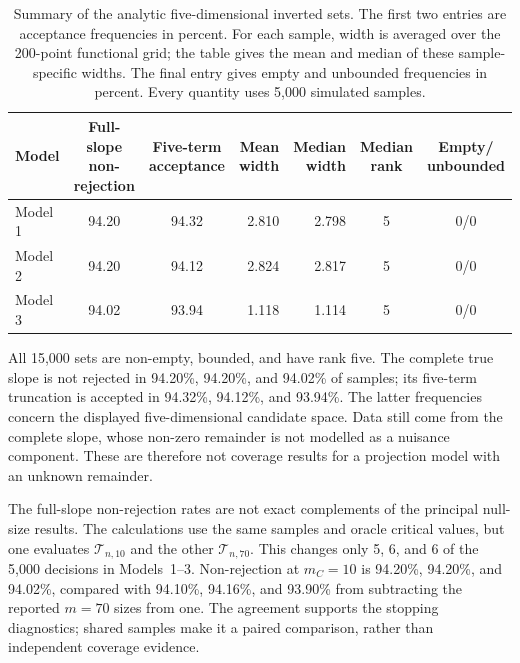 \begin{table}[htbp]
    \centering
    \scriptsize
    \caption[Five-dimensional inverted-set summaries]{Summary of the analytic
    five-dimensional inverted sets.  The first two entries are acceptance
    frequencies in percent.  For each sample, width is averaged over the
    200-point functional grid; the table gives the mean and median of these
    sample-specific widths.  The final entry gives empty and unbounded
    frequencies in percent.  Every quantity uses 5,000 simulated samples.}
    \label{tab:inference-confidence-summary}
    \begin{tabular}{@{}lccrrcc@{}}
        \toprule
        Model & \shortstack{Full-slope\\non-rejection}
              & \shortstack{Five-term\\acceptance}
              & \shortstack{Mean\\width}
              & \shortstack{Median\\width}
              & \shortstack{Median\\rank}
              & \shortstack{Empty/\\unbounded} \\
        \midrule
        Model 1 & 94.20 & 94.32 & 2.810 & 2.798 & 5 & 0/0 \\
        Model 2 & 94.20 & 94.12 & 2.824 & 2.817 & 5 & 0/0 \\
        Model 3 & 94.02 & 93.94 & 1.118 & 1.114 & 5 & 0/0 \\
        \bottomrule
    \end{tabular}
\end{table}

\begin{samepage}
All 15,000 sets are non-empty, bounded, and have rank five.  The complete
true slope is not rejected in 94.20\%, 94.20\%, and 94.02\% of samples; its
five-term truncation is accepted in 94.32\%, 94.12\%, and 93.94\%.
The latter frequencies concern the displayed five-dimensional candidate
space.  Data still come from the complete slope, whose non-zero remainder
is not modelled as a nuisance component.  These are therefore not coverage
results for a projection model with an unknown remainder.
\par
\end{samepage}

The full-slope non-rejection rates are not exact complements of the
principal null-size results.  The calculations use the same samples and oracle
critical values, but one evaluates $\mathcal T_{n,10}$ and the other
$\mathcal T_{n,70}$.  This changes
only 5, 6, and 6 of the 5,000 decisions in Models~1--3.  Non-rejection at
$m_C=10$ is 94.20\%, 94.20\%, and 94.02\%, compared with 94.10\%, 94.16\%,
and 93.90\% from subtracting the reported $m=70$ sizes from one.  The agreement
supports the stopping diagnostics; shared samples make it a paired comparison,
rather than independent coverage evidence.


